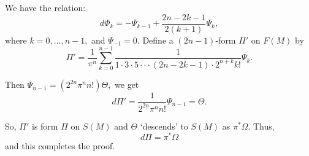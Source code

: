 We have the relation:
$$d\Phi_k=-\Psi_{k-1}+\frac{2n-2k-1}{2(k+1)}\Psi_k,$$
where $k=0,\ldots, n-1,$ and $\Psi_{-1}=0.$
Define a $(2n-1)$-form $\Pi'$ on $F(M)$ by
$$\Pi'=\frac{1}{\pi^n}\sum_{k=0}^{n-1}\frac{1}{1\cdot 3\cdot 5\cdot \cdot \cdot (2n-2k-1)\cdot 2^{n+k}k!}\Psi_k.$$

Then $\Psi_{n-1}=(2^{2n}\pi^n n!)\Theta,$ we get
$$d\Pi'=\frac{1}{2^{2n}\pi^n n!}\Psi_{n-1}=\Theta.$$

So, $\Pi'$ is form $\Pi$ on $S(M)$ and $\Theta$ `descends' to $S(M)$ as $\pi^*\Omega.$
Thus,
$$d\Pi=\pi^*\Omega$$
and this completes the proof.
